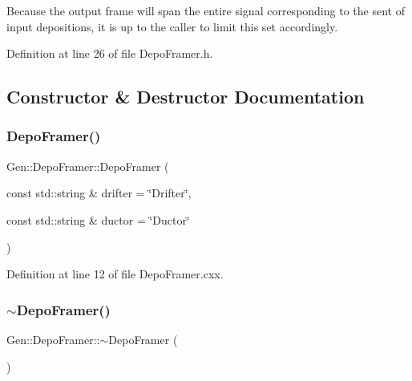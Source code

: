 Because the output frame will span the entire signal corresponding to the sent of input depositions, it is up to the caller to limit this set accordingly. 

Definition at line 26 of file Depo\+Framer.\+h.



\subsection{Constructor \& Destructor Documentation}
\mbox{\label{class_wire_cell_1_1_gen_1_1_depo_framer_a3e9b79b211fdff52e2f20cfa0956c298}} 
\subsubsection{\texorpdfstring{Depo\+Framer()}{DepoFramer()}}
{\footnotesize\ttfamily Gen\+::\+Depo\+Framer\+::\+Depo\+Framer (\begin{DoxyParamCaption}\item[{const std\+::string \&}]{drifter = {\ttfamily \char`\"{}Drifter\char`\"{}},  }\item[{const std\+::string \&}]{ductor = {\ttfamily \char`\"{}Ductor\char`\"{}} }\end{DoxyParamCaption})}



Definition at line 12 of file Depo\+Framer.\+cxx.

\mbox{\label{class_wire_cell_1_1_gen_1_1_depo_framer_a34ad1abcd0b204c1b7baf2fb454dda5a}} 
\subsubsection{\texorpdfstring{$\sim$\+Depo\+Framer()}{~DepoFramer()}}
{\footnotesize\ttfamily Gen\+::\+Depo\+Framer\+::$\sim$\+Depo\+Framer (\begin{DoxyParamCaption}{ }\end{DoxyParamCaption})\hspace{0.3cm}{\ttfamily [virtual]}}



